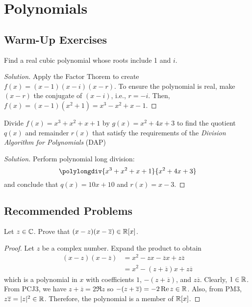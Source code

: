 \chapter{Polynomials}

\section{Warm-Up Exercises}

\begin{warmup}
  Find a real cubic polynomial whose roots include 1 and $i$.
\end{warmup}
\begin{proof}[Solution]
  Apply the Factor Thorem to create $f(x) = (x-1)(x-i)(x-r)$.
  To ensure the polynomial is real, make $(x-r)$ the conjugate of $(x-i)$, i.e., $r=-i$.
  Then, $f(x) = (x-1)(x^2+1) = x^3 - x^2 + x - 1$.
\end{proof}


\begin{warmup}
  Divide $f(x)=x^3+x^2+x+1$ by $g(x)=x^2+4x+3$ to find the quotient $q(x)$ and remainder $r(x)$
  that satisfy the requirements of the \emph{Division Algorithm for Polynomials} (DAP)
\end{warmup}
\begin{proof}[Solution]
  Perform polynomial long division:
  \[ \polylongdiv{x^3+x^2+x+1}{x^2+4x+3} \]
  and conclude that $q(x) = 10x + 10$ and $r(x) = x - 3$.
\end{proof}


\section{Recommended Problems}

\begin{recommended}
  Let $z\in\mathbb{C}$. Prove that $(x-z)(x-\overline{z}) \in \mathbb{R}[x]$.
\end{recommended}
\begin{proof}
  Let $z$ be a complex number.
  Expand the product to obtain
  \begin{align*}
    (x-z)(x-\overline{z}) & = x^2 - zx - \overline{z}x + z\overline{z}  \\
                          & = x^2 - (z + \overline{z})x + z\overline{z}
  \end{align*}
  which is a polynomial in $x$ with coefficients $1$, $-(z+\overline{z})$, and $z\overline{z}$.
  Clearly, $1 \in \mathbb{R}$.
  From PCJ3, we have $z+\overline{z} = 2\Re z$ so $-(z+\overline{z}) = -2 \Re z \in \mathbb{R}$.
  Also, from PM3, $z\overline{z}=|z|^2 \in \mathbb{R}$.
  Therefore, the polynomial is a member of $\mathbb{R}[x]$.
\end{proof}


